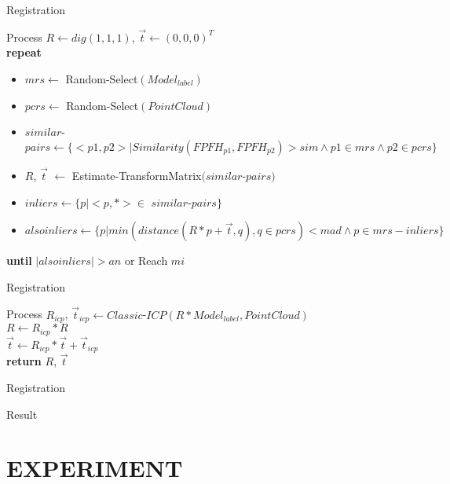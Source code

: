 \documentclass[xcolor=table,compress,blue]{beamer}
\begin{document}
\begin{frame}{Registration}
	\begin{exampleblock}{Process}
		$R\leftarrow dig(1,1,1)$, $\vec t\leftarrow (0,0,0)^T$ 
		\\ \textbf{repeat} 
		\begin{itemize}
		\item $mrs \leftarrow $ Random-Select$(Model_{label})$
		\item $pcrs \leftarrow$ Random-Select$(Point Cloud)$
		\item $similar$-$pairs \leftarrow \{<p1,p2>|Similarity(FPFH_{p1},FPFH_{p2})>sim  \wedge p1 \in mrs \wedge p2 \in pcrs\}$
		\item $R$, $\vec t$ $\leftarrow$ Estimate-TransformMatrix$(similar$-$pairs)$
		\item $inliers \leftarrow \{p| <p,*> \in $ $similar$-$pairs\}$
		\item $alsoinliers \leftarrow \{p| min (distance(R*p+\vec t,q), q\in pcrs) < mad \wedge p \in mrs-inliers \}$
		\end{itemize}
		\textbf{until} \quad $|alsoinliers| > an$ or Reach $mi$
	\end{exampleblock}
\end{frame}
\begin{frame}{Registration}
	\begin{exampleblock}{Process}
		$R_{icp}$, $\vec t_{icp} \leftarrow Classic$-$ICP(R * Model_{label}, Point Cloud)$
		\\ $R \leftarrow R_{icp} * R$
		\\ $\vec t \leftarrow R_{icp} * \vec t + \vec t_{icp}$
		\\ \textbf{return} $R$, $\vec t$
	\end{exampleblock}
\end{frame}	
\begin{frame}{Registration}
	\begin{exampleblock}{Result}
	\end{exampleblock}
\end{frame}



\section{EXPERIMENT}
\end{document}
